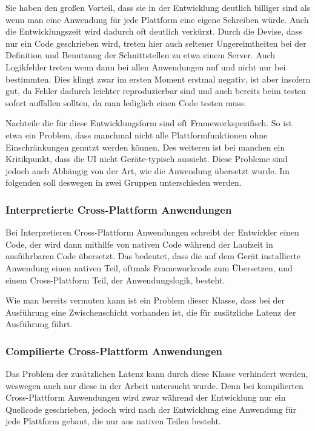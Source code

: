 Sie haben den großen Vorteil, dass sie in der Entwicklung deutlich billiger sind als wenn man eine Anwendung für jede Plattform eine eigene Schreiben würde. Auch die Entwicklungszeit wird dadurch oft deutlich verkürzt. Durch die Devise, dass nur ein Code geschrieben wird, treten hier auch seltener Ungereimtheiten bei der Definition und Benutzung der Schnittstellen zu etwa einem Server. Auch Logikfehler treten wenn dann bei allen Anwendungen auf und nicht nur bei bestimmten. Dies klingt zwar im ersten Moment erstmal negativ, ist aber insofern gut, da Fehler dadurch leichter reproduzierbar sind und auch bereits beim testen sofort auffallen sollten, da man lediglich einen Code testen muss.

Nachteile die für diese Entwicklungsform sind oft Frameworkspezifisch. So ist etwa ein Problem, dass manchmal nicht alle Plattformfunktionen ohne Einschränkungen genutzt werden können. Des weiteren ist bei manchen ein Kritikpunkt, dass die UI nicht Geräte-typisch aussieht. Diese Probleme sind jedoch auch Abhängig von der Art, wie die Anwendung übersetzt wurde. Im folgenden soll deswegen in zwei Gruppen unterschieden werden.

\subsubsection{Interpretierte Cross-Plattform Anwendungen}
Bei Interpretieren Cross-Plattform Anwendungen schreibt der Entwickler einen Code, der wird dann mithilfe von nativen Code während der Laufzeit in ausführbaren Code übersetzt. Das bedeutet, dass die auf dem Gerät installierte Anwendung einen nativen Teil, oftmals Frameworkcode zum Übersetzen, und einem Cross-Plattform Teil, der Anwendungslogik, besteht. \cite{IEEE_development_classes}

Wie man bereits vermuten kann ist ein Problem dieser Klasse, dass bei der Ausführung eine Zwischenschicht vorhanden ist, die für zusätzliche Latenz der Ausführung führt.

\subsubsection{Compilierte Cross-Plattform Anwendungen}
Das Problem der zusätzlichen Latenz kann durch diese Klasse verhindert werden, weswegen auch nur diese in der Arbeit untersucht wurde. Denn bei kompilierten Cross-Plattform Anwendungen wird zwar während der Entwicklung nur ein Quellcode geschrieben, jedoch wird nach der Entwicklung eine Anwendung für jede Plattform gebaut, die nur aus nativen Teilen besteht.\cite{IEEE_development_classes}
